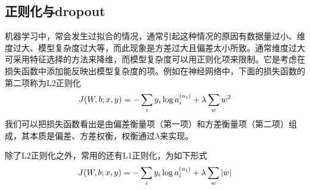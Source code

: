 \subsection{正则化与dropout}
机器学习中，常会发生过拟合的情况，通常引起这种情况的原因有数据量过小、维度过大、模型复杂度过大等，而此现象是方差过大且偏差太小所致。通常维度过大可采用特征选择的方法来降维，而模型复杂度可以用正则化项来限制。它是考虑在损失函数中添加能反映出模型复杂度的项。例如在神经网络中，下面的损失函数的第二项称为L2正则化
\begin{eqnarray}
J(W,b;x,y) = -\sum_i y_i \log \samplet{a}{n_l}{i} + \lambda\sum_w w^2
\end{eqnarray}
我们可以把损失函数看出是由偏差衡量项（第一项）和方差衡量项（第二项）组成，其本质是偏差、方差权衡，权衡通过$\lambda$来实现。

除了L2正则化之外，常用的还有L1正则化，为如下形式
\begin{eqnarray}
J(W,b;x,y) = -\sum_i y_i \log \samplet{a}{n_l}{i} + \lambda\sum_w |w|
\end{eqnarray}

